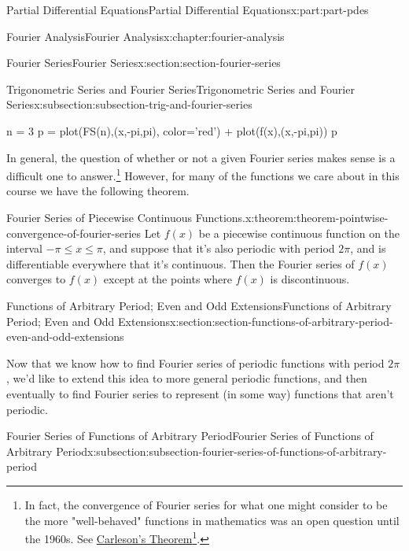 \documentclass[twoside,10pt,]{book}
\numberwithin{equation}{part}
\begin{document}
\begin{partptx}{Partial Differential Equations}{}{Partial Differential Equations}{}{}{x:part:part-pdes}
\begin{chapterptx}{Fourier Analysis}{}{Fourier Analysis}{}{}{x:chapter:fourier-analysis}
\begin{sectionptx}{Fourier Series}{}{Fourier Series}{}{}{x:section:section-fourier-series}
\begin{subsectionptx}{Trigonometric Series and Fourier Series}{}{Trigonometric Series and Fourier Series}{}{}{x:subsection:subsection-trig-and-fourier-series}
\begin{sageinput}
n = 3
p = plot(FS(n),(x,-pi,pi), color='red') + plot(f(x),(x,-pi,pi))
p
\end{sageinput}
In general, the question of whether or not a given Fourier series makes sense is a difficult one to answer.\footnote{In fact, the convergence of Fourier series for what one might consider to be the more "well-behaved" functions in mathematics was an open question until the 1960s. See \href{https://en.wikipedia.org/wiki/Carleson\%27s_theorem}{Carleson's Theorem}\footnote{\nolinkurl{https://en.wikipedia.org/wiki/Carleson\%27s_theorem}\label{g:fn:idp105548816677920}}.\label{x:fn:footnote-convergence-of-fourier-series}} However, for many of the functions we care about in this course we have the following theorem.%
\begin{theorem}{Fourier Series of Piecewise Continuous Functions.}{}{x:theorem:theorem-pointwise-convergence-of-fourier-series}%
%
Let \(f(x)\) be a piecewise continuous function on the interval \(-\pi\leq x\leq\pi\), and suppose that it's also periodic with period \(2\pi\), and is differentiable everywhere that it's continuous. Then the Fourier series of \(f(x)\) converges to \(f(x)\) except at the points where \(f(x)\) is discontinuous.%
\end{theorem}
\end{subsectionptx}
\end{sectionptx}
%
%
\typeout{************************************************}
\typeout{************************************************}
%
\begin{sectionptx}{Functions of Arbitrary Period; Even and Odd Extensions}{}{Functions of Arbitrary Period; Even and Odd Extensions}{}{}{x:section:section-functions-of-arbitrary-period-even-and-odd-extensions}
\begin{introduction}{}%
Now that we know how to find Fourier series of periodic functions with period \(2\pi\), we'd like to extend this idea to more general periodic functions, and then eventually to find Fourier series to represent (in some way) functions that aren't periodic.%
\end{introduction}%
%
%
\typeout{************************************************}
\typeout{************************************************}
%
\begin{subsectionptx}{Fourier Series of Functions of Arbitrary Period}{}{Fourier Series of Functions of Arbitrary Period}{}{}{x:subsection:subsection-fourier-series-of-functions-of-arbitrary-period}

\end{subsectionptx}
\end{sectionptx}
\end{chapterptx}
\end{partptx}
\end{document}
